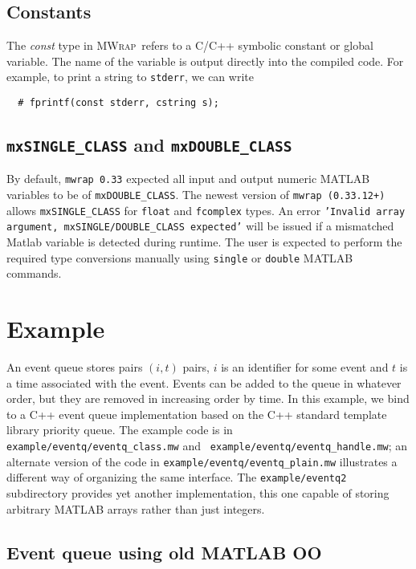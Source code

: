 \documentclass[12pt]{article}
\newcommand{\mwrap}{\textsc{MWrap}}
\begin{document}
\subsection{Constants}

The {\it const} type in \mwrap\ refers to a C/C++ symbolic constant or
global variable.  The name of the variable is output directly into the
compiled code.  For example, to print a string to {\tt stderr}, we can
write
\begin{verbatim}
  # fprintf(const stderr, cstring s);
\end{verbatim}


\subsection{{\tt mxSINGLE\_CLASS} and {\tt mxDOUBLE\_CLASS}}

By default, {\tt mwrap 0.33} expected all input and output numeric
MATLAB variables to be of {\tt mxDOUBLE\_CLASS}. The newest version of
{\tt mwrap (0.33.12+)} allows {\tt mxSINGLE\_CLASS} for {\tt float}
and {\tt fcomplex} types. An error {\tt 'Invalid array argument,
  mxSINGLE/DOUBLE\_CLASS expected'} will be issued if a mismatched
Matlab variable is detected during runtime. The user is expected to
perform the required type conversions manually using {\tt single} or
{\tt double} MATLAB commands.


\section{Example}

An event queue stores pairs $(i, t)$ pairs, $i$ is an identifier for
some event and $t$ is a time associated with the event.  Events can be
added to the queue in whatever order, but they are removed in
increasing order by time.  In this example, we bind to a C++ event
queue implementation based on the C++ standard template library
priority queue.  The example code is in {\tt
  example/eventq/eventq\_class.mw} and {\tt
  example/eventq/eventq\_handle.mw}; an alternate version of the code
in {\tt example/eventq/eventq\_plain.mw} illustrates a different way
of organizing the same interface.  The {\tt example/eventq2}
subdirectory provides yet another implementation, this one capable of
storing arbitrary MATLAB arrays rather than just integers.

\subsection{Event queue using old MATLAB OO}
\end{document}
